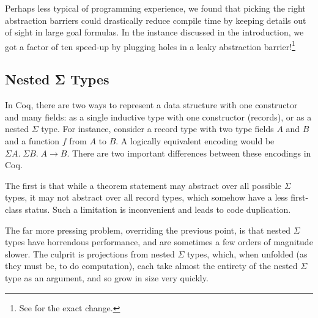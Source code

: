     Perhaps less typical of programming experience, we found that picking the right abstraction barriers could drastically reduce compile time by keeping details out of sight in large goal formulas.
    In the instance discussed in the introduction, we got a factor of ten speed-up by plugging holes in a leaky abstraction barrier!\footnote{See  for the exact change.}

\subsection{Nested Σ Types} \label{sec:nested-sigma-types}
  In Coq, there are two ways to represent a data structure with one constructor and many fields:
  as a single inductive type with one constructor (records), or as a nested $\Sigma$ type.
  For instance, consider a record type with two type fields $A$ and $B$ and a function $f$ from $A$ to $B$.
  A logically equivalent encoding would be $\Sigma A. \; \Sigma B. \; A \to B$.
  There are two important differences between these encodings in Coq.

  \label{sec:prim-record-proj}
  The first is that while a theorem statement may abstract over all possible $\Sigma$ types, it may not abstract over all record types, which somehow have a less first-class status.
  Such a limitation is inconvenient and leads to code duplication.

  The far more pressing problem, overriding the previous point, is that nested $\Sigma$ types have horrendous performance, and are sometimes a few orders of magnitude slower.
  The culprit is projections from nested $\Sigma$ types, which, when unfolded (as they must be, to do computation), each take almost the entirety of the nested $\Sigma$ type as an argument, and so grow in size very quickly.

